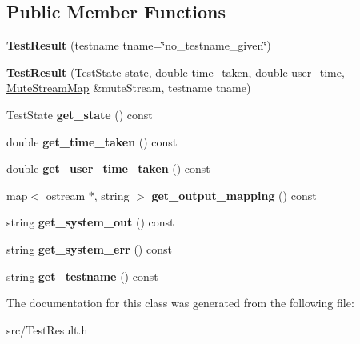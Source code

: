 \subsection*{Public Member Functions}
\begin{DoxyCompactItemize}
\item 
\hypertarget{class_test_result_a3b6f7d34af755aae0f8525f4deb46383}{{\bfseries Test\-Result} (testname tname=\char`\"{}no\-\_\-testname\-\_\-given\char`\"{})}\label{class_test_result_a3b6f7d34af755aae0f8525f4deb46383}

\item 
\hypertarget{class_test_result_ac93bc171d7b86d3d801aaf6070055e81}{{\bfseries Test\-Result} (Test\-State state, double time\-\_\-taken, double user\-\_\-time, \hyperlink{class_mute_stream_map}{Mute\-Stream\-Map} \&mute\-Stream, testname tname)}\label{class_test_result_ac93bc171d7b86d3d801aaf6070055e81}

\item 
\hypertarget{class_test_result_ae4175b68ffd35b6566202da1173c9272}{Test\-State {\bfseries get\-\_\-state} () const }\label{class_test_result_ae4175b68ffd35b6566202da1173c9272}

\item 
\hypertarget{class_test_result_a283696bc3038812c28f99d7391539478}{double {\bfseries get\-\_\-time\-\_\-taken} () const }\label{class_test_result_a283696bc3038812c28f99d7391539478}

\item 
\hypertarget{class_test_result_a73ebcaa2b7f3e215944495916bcda7e1}{double {\bfseries get\-\_\-user\-\_\-time\-\_\-taken} () const }\label{class_test_result_a73ebcaa2b7f3e215944495916bcda7e1}

\item 
\hypertarget{class_test_result_a4f93f69779f48b8c6c3352c361cc8c0b}{map$<$ ostream $\ast$, string $>$ {\bfseries get\-\_\-output\-\_\-mapping} () const }\label{class_test_result_a4f93f69779f48b8c6c3352c361cc8c0b}

\item 
\hypertarget{class_test_result_a96e7cf222dcb94d5fbc0e59d76c9bcf6}{string {\bfseries get\-\_\-system\-\_\-out} () const }\label{class_test_result_a96e7cf222dcb94d5fbc0e59d76c9bcf6}

\item 
\hypertarget{class_test_result_a5b12233aa771285878c48a853c7b8881}{string {\bfseries get\-\_\-system\-\_\-err} () const }\label{class_test_result_a5b12233aa771285878c48a853c7b8881}

\item 
\hypertarget{class_test_result_a9e4f331df5b61506265a9212a9e779af}{string {\bfseries get\-\_\-testname} () const }\label{class_test_result_a9e4f331df5b61506265a9212a9e779af}

\end{DoxyCompactItemize}


The documentation for this class was generated from the following file\-:\begin{DoxyCompactItemize}
\item 
src/Test\-Result.\-h\end{DoxyCompactItemize}
